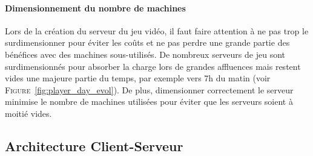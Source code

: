 \paragraph{Dimensionnement du nombre de machines\\}
Lors de la création du serveur du jeu vidéo, il faut faire attention à ne pas trop le surdimensionner pour éviter les coûts et ne pas perdre une grande partie des bénéfices avec des machines sous-utilisés. De nombreux serveurs de jeu sont surdimensionnés pour absorber la charge lors de grandes affluences mais restent vides une majeure partie du temps, par exemple vers 7h du matin (voir \textsc{Figure}~\ref{fig:player_day_evol}). De plus, dimensionner correctement le serveur minimise le nombre de machines utilisées pour éviter que les serveurs soient à moitié vides.

\subsection{Architecture Client-Serveur}
